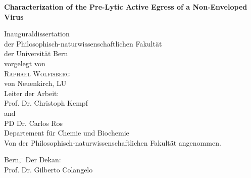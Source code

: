\documentclass[11pt, titlepage, a4paper, twoside, onecolumn, DIV=calc]{scrbook} %
\begin{document}
\begin{titlepage}
\vspace{-2cm}
\begin{flushright}
\end{flushright}
\begin{center}
\begin{spacing}{2.5}
{\Huge \bfseries Characterization of the Pre-Lytic Active Egress of a Non-Enveloped Virus} \\[.9 cm]
\end{spacing}
{\Large Inauguraldissertation \\
der Philosophisch-naturwissenschaftlichen Fakultät \\
der Universität Bern \\[1.1 cm]
{\large vorgelegt von}\\[0.3 cm]
{\LARGE \textsc{Raphael Wolfisberg}} \\[0.3 cm]
{\large von Neuenkirch, LU} \\ [1.4 cm]
{\Large Leiter der Arbeit:\\ [0.1 cm]
{\textsc Prof. Dr. Christoph Kempf} \\
and \\
{\textsc PD Dr. Carlos Ros} \\ [0.3 cm]
Departement für Chemie und Biochemie} \\[1.1cm]
Von der Philosophisch-naturwissenschaftlichen Fakultät angenommen.} \\[.7cm]
\end{center}
\begin{tabbing}

\= Bern, \= \hspace{5.5cm} Der Dekan: \\[1.3cm]
\> \> \hspace{5.5cm} Prof. Dr. Gilberto Colangelo
\end{tabbing}
\end{titlepage}


\cleardoublepage








\frontmatter %
\setcounter{page}{0}
\end{document}
